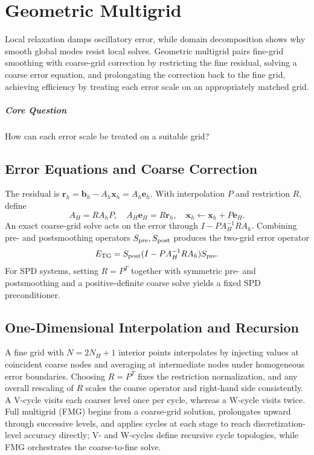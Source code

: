 \chapter{Geometric Multigrid}\label{v0ch:19}
\begin{chaptersummary}
Local relaxation damps oscillatory error, while domain decomposition shows why smooth global modes resist local solves. Geometric multigrid pairs fine-grid smoothing with coarse-grid correction by restricting the fine residual, solving a coarse error equation, and prolongating the correction back to the fine grid, achieving efficiency by treating each error scale on an appropriately matched grid.
\end{chaptersummary}
\paragraph{Core Question}How can each error scale be treated on a suitable grid?

\section{Error Equations and Coarse Correction}
The residual is $\bm r_h=\bm b_h-A_h\bm x_h=A_h\bm e_h$. With interpolation $P$ and restriction $R$, define
\[
 A_H=RA_hP,\quad A_H\bm e_H=R\bm r_h,\quad
 \bm x_h\leftarrow\bm x_h+P\bm e_H.
\]
An exact coarse-grid solve acts on the error through $I-PA_H^{-1}RA_h$. Combining pre- and postsmoothing operators $S_{\rm pre},S_{\rm post}$ produces the two-grid error operator
\[
 E_{\rm TG}=S_{\rm post}(I-PA_H^{-1}RA_h)S_{\rm pre}.
\]
For SPD systems, setting $R=P^T$ together with symmetric pre- and postsmoothing and a positive-definite coarse solve yields a fixed SPD preconditioner.
\section{One-Dimensional Interpolation and Recursion}
A fine grid with $N=2N_H+1$ interior points interpolates by injecting values at coincident coarse nodes and averaging at intermediate nodes under homogeneous error boundaries. Choosing $R=P^T$ fixes the restriction normalization, and any overall rescaling of $R$ scales the coarse operator and right-hand side consistently.
A V-cycle visits each coarser level once per cycle, whereas a W-cycle visits twice. Full multigrid (FMG) begins from a coarse-grid solution, prolongates upward through successive levels, and applies cycles at each stage to reach discretization-level accuracy directly; V- and W-cycles define recursive cycle topologies, while FMG orchestrates the coarse-to-fine solve.
